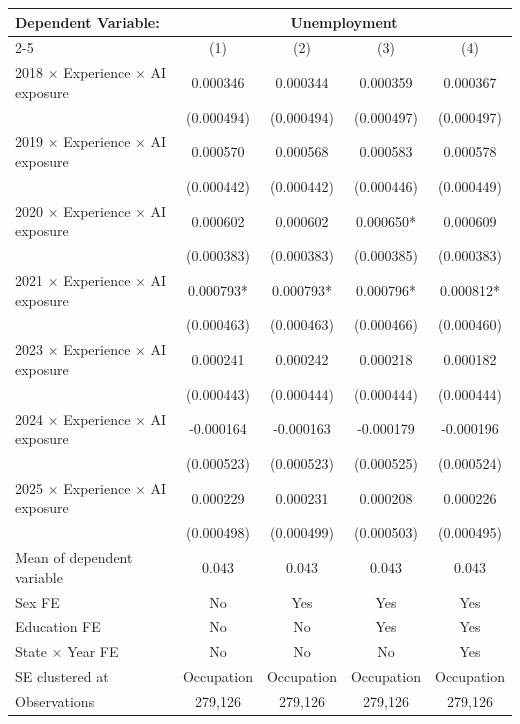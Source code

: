 \def\sym#1{\ifmmode^{#1}\else\(^{#1}\)\fi}
\begin{tabular}{l*{4}{c}}
\toprule
Dependent Variable: & \multicolumn{4}{c}{Unemployment} \\
\cmidrule(lr){2-5}
 & (1) & (2) & (3) & (4) \\
\midrule
2018 $\times$ Experience $\times$ AI exposure&    0.000346   &    0.000344   &    0.000359   &    0.000367   \\
            &  (0.000494)   &  (0.000494)   &  (0.000497)   &  (0.000497)   \\
2019 $\times$ Experience $\times$ AI exposure&    0.000570   &    0.000568   &    0.000583   &    0.000578   \\
            &  (0.000442)   &  (0.000442)   &  (0.000446)   &  (0.000449)   \\
2020 $\times$ Experience $\times$ AI exposure&    0.000602   &    0.000602   &    0.000650*  &    0.000609   \\
            &  (0.000383)   &  (0.000383)   &  (0.000385)   &  (0.000383)   \\
2021 $\times$ Experience $\times$ AI exposure&    0.000793*  &    0.000793*  &    0.000796*  &    0.000812*  \\
            &  (0.000463)   &  (0.000463)   &  (0.000466)   &  (0.000460)   \\
2023 $\times$ Experience $\times$ AI exposure&    0.000241   &    0.000242   &    0.000218   &    0.000182   \\
            &  (0.000443)   &  (0.000444)   &  (0.000444)   &  (0.000444)   \\
2024 $\times$ Experience $\times$ AI exposure&   -0.000164   &   -0.000163   &   -0.000179   &   -0.000196   \\
            &  (0.000523)   &  (0.000523)   &  (0.000525)   &  (0.000524)   \\
2025 $\times$ Experience $\times$ AI exposure&    0.000229   &    0.000231   &    0.000208   &    0.000226   \\
            &  (0.000498)   &  (0.000499)   &  (0.000503)   &  (0.000495)   \\
\midrule
Mean of dependent variable&       0.043   &       0.043   &       0.043   &       0.043   \\
Sex FE      &          No   &         Yes   &         Yes   &         Yes   \\
Education FE&          No   &          No   &         Yes   &         Yes   \\
State $\times$ Year FE&          No   &          No   &          No   &         Yes   \\
SE clustered at&  Occupation   &  Occupation   &  Occupation   &  Occupation   \\
Observations&     279,126   &     279,126   &     279,126   &     279,126   \\
\bottomrule
\end{tabular}
